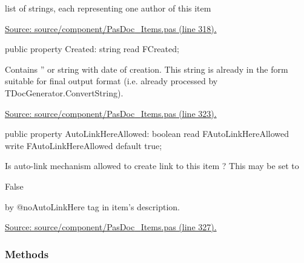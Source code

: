 \documentclass{report}
\newif\ifpdf
\begin{document}
\begin{list}{}
\par list of strings, each representing one author of this item\par
\href{https://github.com/pasdoc/pasdoc/blob/master/source/component/PasDoc_Items.pas#L318}{Source: source/component/PasDoc{\_}Items.pas (line 318).}\label{PasDoc_Items.TBaseItem-Created}
\item[\textbf{Created}\hfill]
\ifpdf
\begin{flushleft}
\fi
\begin{ttfamily}
public property Created: string read FCreated;\end{ttfamily}

\ifpdf
\end{flushleft}
\fi


\par Contains '' or string with date of creation. This string is already in the form suitable for final output format (i.e. already processed by TDocGenerator.ConvertString).\par
\href{https://github.com/pasdoc/pasdoc/blob/master/source/component/PasDoc_Items.pas#L323}{Source: source/component/PasDoc{\_}Items.pas (line 323).}\label{PasDoc_Items.TBaseItem-AutoLinkHereAllowed}
\item[\textbf{AutoLinkHereAllowed}\hfill]
\ifpdf
\begin{flushleft}
\fi
\begin{ttfamily}
public property AutoLinkHereAllowed: boolean
      read FAutoLinkHereAllowed write FAutoLinkHereAllowed default true;\end{ttfamily}

\ifpdf
\end{flushleft}
\fi


\par Is auto{-}link mechanism allowed to create link to this item ? This may be set to \begin{ttfamily}False\end{ttfamily} by @noAutoLinkHere tag in item's description.\par
\href{https://github.com/pasdoc/pasdoc/blob/master/source/component/PasDoc_Items.pas#L327}{Source: source/component/PasDoc{\_}Items.pas (line 327).}\end{list}
\subsubsection*{\large{\textbf{Methods}}\normalsize\hspace{1ex}\hfill}
\end{document}
